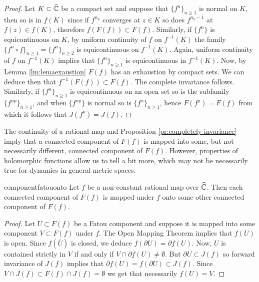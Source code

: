 \begin{proof}
Let $K\subset \widehat{\mathbb{C}}$ be a compact set and suppose that $\{f^n\}_{n\geq 1}$ is normal on $K$, then so is in $f(K)$ since if $f^{n_k}$ converges at $z\in K$ so does $f^{n_k-1}$ at $f(z)\in f(K)$, therefore $f(F(f))\subset F(f)$. Similarly, if $\{f^n\}$ is equicontinuous on $K$, by uniform continuity of $f$ on $f^{-1}(K)$ the family $\{ f^{n}\circ f\}_{n\geq 1} = \{f^{n}\}_{n\geq 2}$ is equicontinuous on $f^{-1}(K)$. Again, uniform continuity of $f$ on $f^{-1}(K)$ implies that $\{f^n\}_{n\geq 1}$ is equicontinuous in $f^{-1}(K)$. Now, by Lemma \ref{lm:lemaexaustion} $F(f)$ has an exhaustion by compact sets. We can deduce then that $f^{-1}(F(f))\subset F(f)$. The complete invariance follows.\\

Similarly, if $\{f^n\}_{n\geq 1}$ is equicontinuous on an open set so is the subfamily $\{f^{np}\}_{n\geq 1}$, and when $\{f^{np}\}$ is normal so is $\{f^n\}_{n\geq 1}$, hence $F(f^p)=F(f)$ from which it follows that $J(f^p)=J(f)$. 
\end{proof}

The continuity of a rational map and Proposition \ref{pr:completely invariance} imply that a connected component of $F(f)$ is mapped into some, but not necessarily different, connected component of $F(f)$. However, properties of holomorphic functions allow us to tell a bit more, which may not be necessarily true for dynamics in general metric spaces.\\

\begin{myprop}{}{componentfatouonto}
Let $f$ be a non-constant rational map over $\widehat{\mathbb{C}}$. Then each connected component of $F(f)$ is mapped under $f$ onto some other connected component of $F(f)$. 
\end{myprop}
\begin{proof}
Let $U\subset F(f)$ be a Fatou component and suppose it is mapped into some component $V\subset F(f)$ under $f$. The Open Mapping Theorem implies that $f(U)$ is open. Since $f(\overline{U})$ is closed, we deduce $f(\partial U) = \partial f(U)$. Now, $U$ is contained strictly in $V$ if and only if $V\cap \partial f(U) \neq \emptyset$. But $\partial U\subset J(f)$ so forward invariance of $J(f)$ implies that $\partial f(U)=f(\partial U)\subset J(f)$. Since $V\cap J(f)\subset F(f)\cap J(f)=\emptyset$ we get that necessarily $f(U)=V$.
\end{proof}

